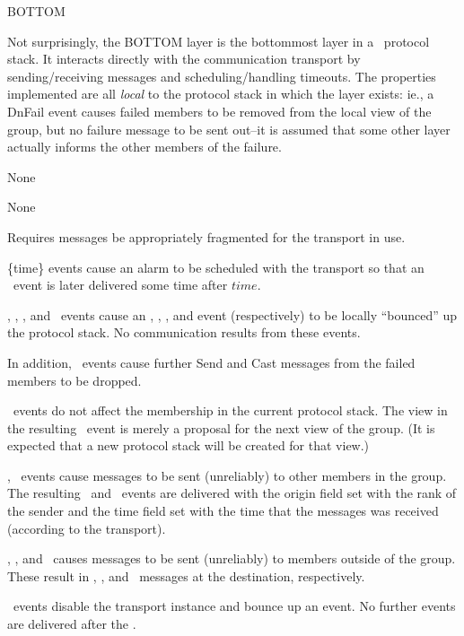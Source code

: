 %
%
%
\begin{Layer}{BOTTOM} 

Not surprisingly, the BOTTOM layer is the bottommost layer in a \ensemble\
protocol stack.  It interacts directly with the communication transport by
sending/receiving messages and scheduling/handling timeouts.  The properties
implemented are all \emph{local} to the protocol stack in which the layer
exists: ie., a DnFail event causes failed members to be removed from the local
view of the group, but no failure message to be sent out--it is assumed that
some other layer actually informs the other members of the failure.

\begin{Protocol}
None
\end{Protocol}

\begin{Parameters}
\item None
\end{Parameters}

\begin{Properties}
\item
Requires messages be appropriately fragmented for the transport in use.
\item
\DnTimer\{time\} events cause an alarm to be scheduled with the transport so
that an \UpTimer\ event is later delivered some time after $time$.
\item
\DnBlock, \DnView, \DnStable, and \DnFail\ events cause an \UpBlock,
\UpView, \UpStable, and \UpFail event (respectively) to be locally
``bounced'' up the protocol stack.  No communication results from these
events.
\item
In addition, \DnFail\ events cause further Send and Cast messages from the
failed members to be dropped.
\item
\DnView\ events do not affect the membership in the current protocol stack.
The view in the resulting \UpView\ event is merely a proposal for the next
view of the group.  (It is expected that a new protocol stack will be
created for that view.)
\item
\DnSend, \DnCast\ events cause messages to be sent (unreliably) to other
members in the group.  The resulting \UpSend\ and \UpCast\ events are delivered
with the origin field set with the rank of the sender and the time field
set with the time that the messages was received (according to the
transport).
\item
\DnMerge, \DnMergeDenied, and \DnMergeGranted\ causes messages to be sent
(unreliably) to members outside of the group.  These result in
\UpMergeRequest, \UpMergeDenied, and \UpMergeGranted\ messages at the
destination, respectively.
\item
\DnLeave\ events disable the transport instance and bounce up an \UpExit
event.  No further events are delivered after the \UpExit. \note{currently,
this may not be true}
\end{Properties}


\end{Layer}
